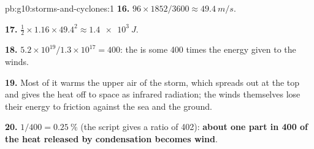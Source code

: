 \begin{solution}{pb:g10:storms-and-cyclones:1}
\textbf{16.} $96 \times 1852/3600 \approx \qty{49.4}{m/s}$.

\textbf{17.} $\frac12 \times 1.16 \times 49.4^2 \approx \qty{1.4e3}{J}$.

\textbf{18.} $5.2\times10^{19}/1.3\times10^{17} = 400$: the  is
some 400 times the energy given to the winds.

\textbf{19.} Most of it warms the upper air of the storm, which spreads out at
the top and gives the heat off to space as infrared radiation; the winds
themselves lose their energy to friction against the sea and the ground.

\textbf{20.} $1/400 = \qty{0.25}{\percent}$ (the script gives a ratio of
402): \textbf{about one part in 400 of the heat released by condensation
becomes wind}.
\end{solution}
